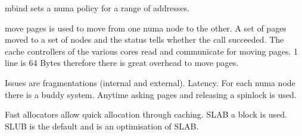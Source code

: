 \documentclass[twoside]{article}
\begin{document}
mbind sets a numa policy for a range of addresses.

move pages is used to move from one numa node to the other. A set of pages moved to a set of nodes and the status tells whether the call succeeded. The cache controllers of the various cores read and communicate for moving pages. 1 line is 64 Bytes therefore there is great overhead to move pages.

Issues are fragmentations (internal and external). Latency. For each numa node there is a buddy system. Anytime asking pages and releasing a spinlock is used.

Fast allocators allow quick allocation through caching. SLAB a block is used. SLUB is the default and is an optimisation of SLAB.

\newpage


\end{document}
